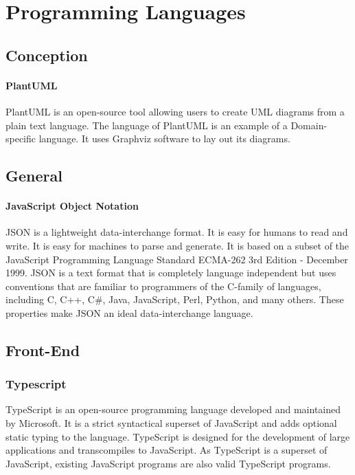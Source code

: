 




\section{Programming Languages}

\subsection{Conception}
\paragraph*{PlantUML}
PlantUML is an open-source tool allowing users to create \ac{UML} diagrams from a plain text language. The language of PlantUML is an example of a Domain-specific language. It uses Graphviz software to lay out its diagrams. 
\subsection{General}
\paragraph*{JavaScript Object Notation}
\ac{JSON} is a lightweight data-interchange format. It is easy for humans to read and write. It is easy for machines to parse and generate. It is based on a subset of the JavaScript Programming Language Standard ECMA-262 3rd Edition - December 1999. \ac{JSON} is a text format that is completely language independent but uses conventions that are familiar to programmers of the C-family of languages, including C, C++, C\#, Java, JavaScript, Perl, Python, and many others. These properties make \ac{JSON} an ideal data-interchange language.

\subsection{Front-End}
\subsubsection{Typescript}
TypeScript is an open-source programming language developed and maintained by Microsoft. It is a strict syntactical superset of JavaScript and adds optional static typing to the language. TypeScript is designed for the development of large applications and transcompiles to JavaScript. As TypeScript is a superset of JavaScript, existing JavaScript programs are also valid TypeScript programs.

